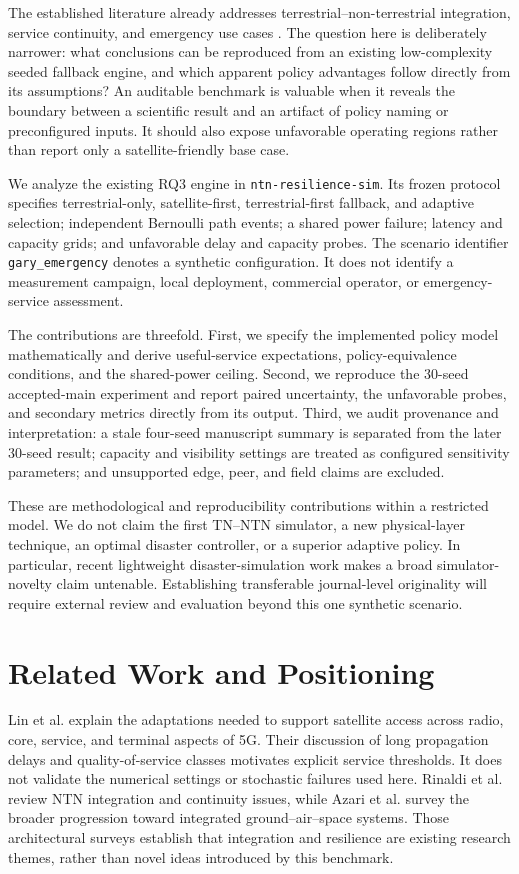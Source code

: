 \documentclass[10pt,twocolumn]{article}
\begin{document}
The established literature already addresses terrestrial--non-terrestrial integration, service continuity, and emergency use cases \cite{lin2021,rinaldi2020,azari2022}. The question here is deliberately narrower: what conclusions can be reproduced from an existing low-complexity seeded fallback engine, and which apparent policy advantages follow directly from its assumptions? An auditable benchmark is valuable when it reveals the boundary between a scientific result and an artifact of policy naming or preconfigured inputs. It should also expose unfavorable operating regions rather than report only a satellite-friendly base case.

We analyze the existing RQ3 engine in \texttt{ntn-resilience-sim}. Its frozen protocol specifies terrestrial-only, satellite-first, terrestrial-first fallback, and adaptive selection; independent Bernoulli path events; a shared power failure; latency and capacity grids; and unfavorable delay and capacity probes. The scenario identifier \texttt{gary\_emergency} denotes a synthetic configuration. It does not identify a measurement campaign, local deployment, commercial operator, or emergency-service assessment.

The contributions are threefold. First, we specify the implemented policy model mathematically and derive useful-service expectations, policy-equivalence conditions, and the shared-power ceiling. Second, we reproduce the 30-seed accepted-main experiment and report paired uncertainty, the unfavorable probes, and secondary metrics directly from its output. Third, we audit provenance and interpretation: a stale four-seed manuscript summary is separated from the later 30-seed result; capacity and visibility settings are treated as configured sensitivity parameters; and unsupported edge, peer, and field claims are excluded.

These are methodological and reproducibility contributions within a restricted model. We do not claim the first TN--NTN simulator, a new physical-layer technique, an optimal disaster controller, or a superior adaptive policy. In particular, recent lightweight disaster-simulation work \cite{wang2026} makes a broad simulator-novelty claim untenable. Establishing transferable journal-level originality will require external review and evaluation beyond this one synthetic scenario.

\section{Related Work and Positioning}
Lin et al. \cite{lin2021} explain the adaptations needed to support satellite access across radio, core, service, and terminal aspects of 5G. Their discussion of long propagation delays and quality-of-service classes motivates explicit service thresholds. It does not validate the numerical settings or stochastic failures used here. Rinaldi et al. \cite{rinaldi2020} review NTN integration and continuity issues, while Azari et al. \cite{azari2022} survey the broader progression toward integrated ground--air--space systems. Those architectural surveys establish that integration and resilience are existing research themes, rather than novel ideas introduced by this benchmark.
\end{document}
